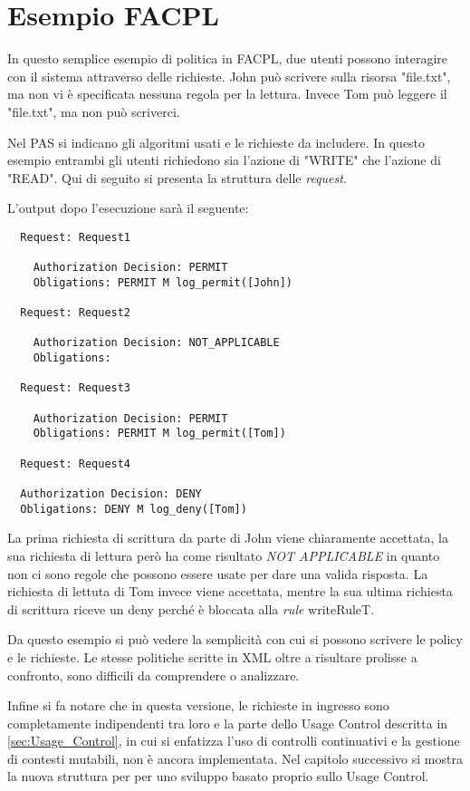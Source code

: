 \section{Esempio FACPL}
\label{sec:Esempio_FACPL}
In questo semplice esempio di politica in \ac{FACPL}, due utenti possono interagire con il sistema attraverso delle richieste.
John può scrivere sulla risorsa "file.txt", ma non vi è specificata nessuna regola per la lettura. Invece Tom può
leggere il "file.txt", ma non può scriverci.\par

Nel PAS si indicano gli algoritmi usati e le richieste da includere.
In questo esempio entrambi gli utenti richiedono sia l'azione di "WRITE" che l'azione di "READ".
Qui di seguito si presenta la struttura delle \emph{request}.

L'output dopo l'esecuzione sarà il seguente:
\begin{verbatim}
  Request: Request1

    Authorization Decision: PERMIT
    Obligations: PERMIT M log_permit([John])

  Request: Request2

    Authorization Decision: NOT_APPLICABLE
    Obligations:

  Request: Request3

    Authorization Decision: PERMIT
    Obligations: PERMIT M log_permit([Tom])

  Request: Request4

  Authorization Decision: DENY
  Obligations: DENY M log_deny([Tom])
\end{verbatim}
La prima richiesta di scrittura da parte di John viene chiaramente accettata, la sua richiesta di lettura però ha
come risultato \emph{NOT APPLICABLE} in quanto non ci sono regole che possono essere usate per dare una valida risposta.
La richiesta di lettuta di Tom invece viene accettata, mentre la sua ultima richiesta di scrittura riceve un deny
perché è bloccata alla \emph{rule} writeRuleT.\par
Da questo esempio si può vedere la semplicità con cui si possono scrivere le policy e le richieste.
Le stesse politiche scritte in \ac{XML} oltre a risultare prolisse a confronto, sono difficili da comprendere o analizzare.\par
Infine si fa notare che in questa versione, le richieste in ingresso sono completamente indipendenti tra loro e
la parte dello Usage Control descritta in \ref{sec:Usage_Control}, in cui si enfatizza l'uso di controlli continuativi e
la gestione di contesti mutabili, non è ancora implementata. Nel capitolo successivo si mostra la nuova struttura per
per uno sviluppo basato proprio sullo Usage Control.
